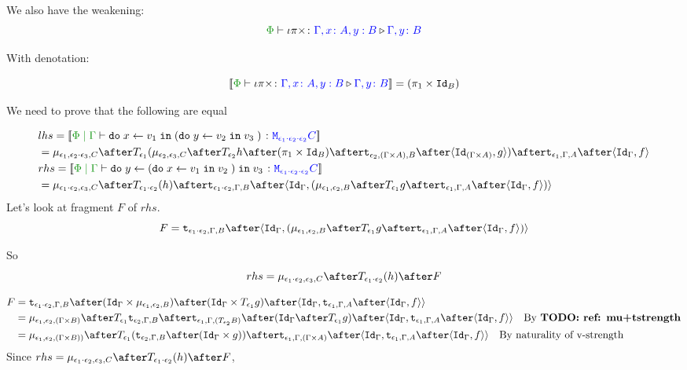 \documentclass{report}
\begin{document}
We also have the weakening:
\begin{equation}
    \ewrel{\P}{\i\pi\times}{\gax, y: B}{\gby}
\end{equation}

With denotation:

\begin{equation}
    \deno{\ewrel{\P}{\i\pi\times}{\gax, y: B}{\gby}} = (\p \times \Id{B})
\end{equation}

We need to prove that the following are equal

\begin{align*}
    &lhs =  \deno{\gpetyperelation{\doin{x}{v_1}{(\doin{y}{v_2}{v_3})}}{\M{\e_1\dot\e_2\dot\e_2}{C}}} \\
    & = \bind{\e_1}{\e_2\dot\e_3}{C}\after\T{
        \e_1}{(\bind{\e_2}{\e_3}{C}\after\T{\e_2}{h\after(\p \times \Id{B})}\after\tstrength{\e_2}{(\G\times A)}{B}\after\pr{\Id{(\G\times A)}}{g}
        )}\after\tstrength{\e_1}{\G}{A}\after\pr{\idg}{f}\\
    & rhs = \deno{\gpetyperelation{\doin{y}{(\doin{x}{v_1}{v_2})}{v_3}}{\M{\e_1\dot\e_2\dot\e_2}{C}}}  \\
    & = \bind{\e_1\dot\e_2}{\e_3}{C}\after\T{\e_1\dot\e_2}{(h)}\after\tstrength{\e_1\dot\e_2}{\G}{B}\after\pr{\idg}{(\bind{\e_1}{\e_2}{B}\after\T{\e_1}{g}\after\tstrength{\e_1}{\G}{A}\after\pr{\idg}{f})} \\
\end{align*}
Let's look at fragment $F$ of $rhs$.
\begin{equation}
    F = \tstrength{\e_1\dot\e_2}{\G}{B}\after\pr{\idg}{(\bind{\e_1}{\e_2}{B}\after\T{\e_1}{g}\after\tstrength{\e_1}{\G}{A}\after\pr{\idg}{f})}
\end{equation}

So 
\begin{equation}
    rhs = \bind{\e_1\dot\e_2}{\e_3}{C}\after\T{\e_1\dot\e_2}{(h)}\after F
\end{equation}

\begin{equation}
    \begin{split}
        F & = \tstrength{\e_1\dot\e_2}{\G}{B}\after(\idg\times\bind{\e_1}{\e_2}{B})\after(\idg\times\T{\e_1}{g})\after\pr{\idg}{\tstrength{\e_1}{\G}{A}\after\pr{\idg}{f}}\\
        &  = \bind{\e_1}{\e_2}{(\G\times B)} \after \T{\e_1}{\tstrength{\e_2}{\G}{B}} \after\tstrength{\e_1}{\G}{(\T{\e_2}{B})} \after (\idg \after\T{\e_1}{g})\after\pr{\idg}{\tstrength{\e_1}{\G}{A}\after\pr{\idg}{f}}\qt{By \todo{ref: mu+tstrength}}
        \\ & = \bind{\e_1}{\e_2}{(\G \times B))} \after \T{\e_1}{(\tstrength{\e_2}{\G}{B} \after (\idg \times g))} \after \tstrength{\e_1}{\G}{(\G \times A)} \after \pr{\idg}{\tstrength{\e_1}{\G}{A}\after\pr{\idg}{f}}\qt{By naturality of v-strength}
    \end{split}
\end{equation}
Since
$
    rhs = \bind{\e_1\dot\e_2}{\e_3}{C}\after\T{\e_1\dot\e_2}{(h)}\after F
$, 
\end{document}
